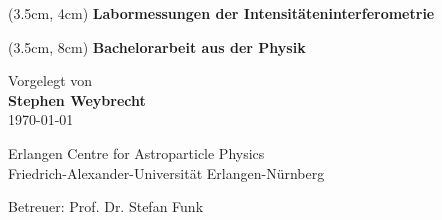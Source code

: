 
\begin{center}

    \vspace*{3cm}
 
    \begin{textblock*}{15 cm}(3.5cm, 4cm)
        \Large \bf{Labormessungen der Intensitäteninterferometrie}
    \end{textblock*}

    \begin{textblock*}{15 cm}(3.5cm, 8cm)
        \bf{Bachelorarbeit aus der Physik}
    \end{textblock*}

    \vspace{4cm}
    
    \vspace{1.2cm}
            Vorgelegt von\\
            {\bf Stephen Weybrecht} \\
            \today

    \vspace*{2.5 cm}
    Erlangen Centre for Astroparticle Physics\\
    Friedrich-Alexander-Universität Erlangen-Nürnberg
    \vspace*{1 cm}

    \vspace*{6 cm}
    Betreuer: Prof. Dr. Stefan Funk
    \vspace*{1 cm}

\end{center}
